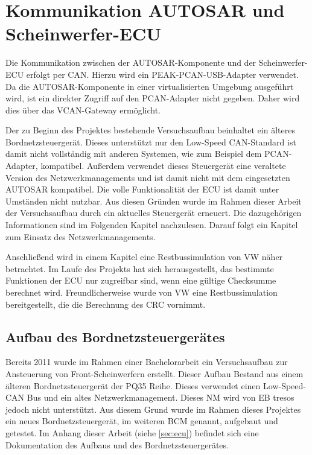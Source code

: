 \documentclass[
  a4paper,					    %
  twoside,
  DIV=calc,     				%
  bibliography=totoc,
  cleardoublepage=empty,
  ngerman,     					%
  final       					%
]{scrbook}
\begin{document}
\section{Kommunikation AUTOSAR und Scheinwerfer-ECU}
\label{sec:Kommunikation_A_S}
Die Kommunikation zwischen der AUTOSAR-Komponente und der Scheinwerfer-ECU erfolgt per CAN. Hierzu wird ein PEAK-PCAN-USB-Adapter verwendet. Da die AUTOSAR-Komponente in einer virtualisierten Umgebung ausgeführt wird, ist ein direkter Zugriff auf den PCAN-Adapter nicht gegeben. Daher wird dies über das VCAN-Gateway ermöglicht.

Der zu Beginn des Projektes bestehende Versuchsaufbau beinhaltet ein älteres Bordnetzsteuergerät. Dieses unterstützt nur den Low-Speed CAN-Standard ist damit nicht vollständig mit anderen Systemen, wie zum Beispiel dem PCAN-Adapter, kompatibel. Außerdem verwendet dieses Steuergerät eine veraltete Version des Netzwerkmanagements und ist damit nicht mit dem eingesetzten AUTOSAR kompatibel. Die volle Funktionalität der ECU ist damit unter Umständen nicht nutzbar. Aus diesen Gründen wurde im Rahmen dieser Arbeit der Versuchsaufbau durch ein aktuelles Steuergerät erneuert. Die dazugehörigen Informationen sind im Folgenden Kapitel nachzulesen. Darauf folgt ein Kapitel zum Einsatz des Netzwerkmanagements.

Anschließend wird in einem Kapitel eine Restbussimulation von VW näher betrachtet. Im Laufe des Projekts hat sich herausgestellt, das bestimmte Funktionen der ECU nur zugreifbar sind, wenn eine gültige Checksumme berechnet wird. Freundlicherweise wurde von VW eine Restbussimulation bereitgestellt, die die Berechnung des CRC vornimmt.




\subsection{Aufbau des Bordnetzsteuergerätes}
\label{sec:Aufbau_der_ECU}
Bereits 2011 wurde im Rahmen einer Bachelorarbeit ein Versuchsaufbau zur Ansteuerung von Front-Scheinwerfern erstellt. Dieser Aufbau Bestand aus einem älteren Bordnetzsteuergerät der PQ35 Reihe. Dieses verwendet einen Low-Speed-CAN Bus und ein altes Netzwerkmanagement. Dieses NM wird von EB tresos jedoch nicht unterstützt. Aus diesem Grund wurde im Rahmen dieses Projektes ein neues Bordnetzsteuergerät, im weiteren BCM genannt, aufgebaut und getestet. Im Anhang dieser Arbeit (siehe \ref{sec:ecu}) befindet sich eine Dokumentation des Aufbaus und des Bordnetzsteuergerätes.
\end{document}
